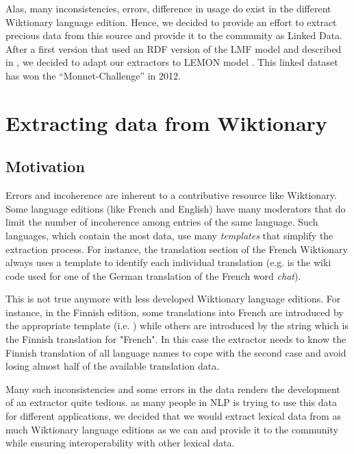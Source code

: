 \documentclass[sw]{iosart2c}
\newcommand{\ffbox}[1]{%
  {%
   \setlength{\fboxsep}{-2\fboxrule}%
   \fbox{\hspace{1.2pt}\strut#1\hspace{1.2pt}}%
  }%
}
\begin{document}
Alas, many inconsistencies, errors, difference in usage do exist in the different Wiktionary language edition. Hence, we decided to provide an effort to extract precious data from this source and provide it to the community as Linked Data. After a first version that used an RDF version of the LMF model \cite{FRANCOPOULO:2006:INRIA-00121468:1,francopoulo-EtAl:2006:MLRI} and described in \cite{serasset:lrec2012}, we decided to adapt our extractors to LEMON model \cite{McRae-lemon:2012}. This linked dataset has won the ``Monnet-Challenge'' in 2012.

\section{Extracting data from Wiktionary}

\subsection{Motivation}

Errors and incoherence are inherent to a contributive resource like Wiktionary. Some language editions (like French and English) have many moderators that do limit the number of incoherence among entries of the same language. Such languages, which contain the most data, use many \textit{templates} that simplify the extraction process. For instance, the translation section of the French Wiktionary always uses a template to identify each individual translation (e.g. \ffbox{\texttt{\small \{\{trad+|de|Katze\}\} ''f''}} is the wiki code used for one of the German translation of the French word \emph{chat}).

This is not true anymore with less developed Wiktionary language editions. For instance, in the Finnish edition, some translations into French are introduced by the appropriate template (i.e. \ffbox{\texttt{\small\{\{fr\}\}}}) while others are introduced by the string \ffbox{\texttt{\small ranska}} which is the Finnish translation for "French". In this case the extractor needs to know the Finnish translation of all language names to cope with the second case and avoid losing almost half of the available translation data.

Many such inconsistencies and some errors in the data renders the development of an extractor quite tedious. as many people in NLP is trying to use this data for different applications, we decided that we would extract lexical data from as much Wiktionary language editions as we can and provide it to the community while ensuring interoperability with other lexical data.
\end{document}
